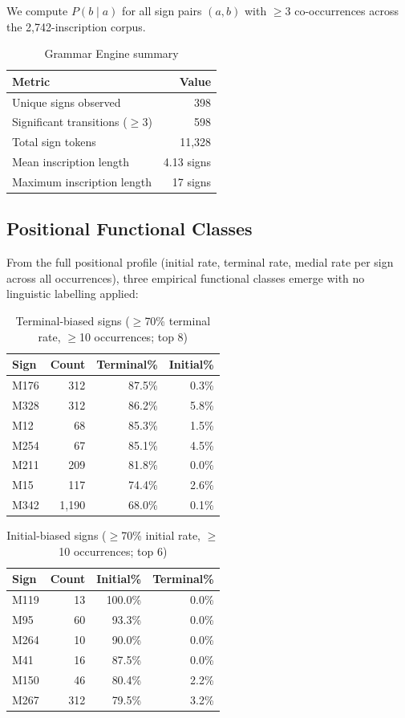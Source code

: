 \documentclass[12pt,letterpaper]{article}
\begin{document}
We compute $P(b \mid a)$ for all sign pairs $(a, b)$ with $\geq 3$
co-occurrences across the 2,742-inscription corpus.

\begin{table}[htbp]
\centering
\caption{Grammar Engine summary}
\begin{tabular}{lr}
\toprule
Metric & Value \\
\midrule
Unique signs observed             & 398 \\
Significant transitions ($\geq$3) & 598 \\
Total sign tokens                 & 11,328 \\
Mean inscription length           & 4.13 signs \\
Maximum inscription length        & 17 signs \\
\bottomrule
\end{tabular}
\end{table}

\subsection{Positional Functional Classes}

From the full positional profile (initial rate, terminal rate, medial
rate per sign across all occurrences), three empirical functional
classes emerge with no linguistic labelling applied:

\begin{table}[H]
\centering
\caption{Terminal-biased signs ($\geq$70\% terminal rate, $\geq$10 occurrences; top 8)}
\begin{tabular}{lrrr}
\toprule
Sign & Count & Terminal\% & Initial\% \\
\midrule
M176 & 312 & 87.5\% & 0.3\% \\
M328 & 312 & 86.2\% & 5.8\% \\
M12  &  68 & 85.3\% & 1.5\% \\
M254 &  67 & 85.1\% & 4.5\% \\
M211 & 209 & 81.8\% & 0.0\% \\
M15  & 117 & 74.4\% & 2.6\% \\
M342 & 1,190 & 68.0\% & 0.1\% \\
\bottomrule
\end{tabular}
\end{table}

\begin{table}[H]
\centering
\caption{Initial-biased signs ($\geq$70\% initial rate, $\geq$10 occurrences; top 6)}
\begin{tabular}{lrrr}
\toprule
Sign & Count & Initial\% & Terminal\% \\
\midrule
M119 &  13 & 100.0\% &  0.0\% \\
M95  &  60 &  93.3\% &  0.0\% \\
M264 &  10 &  90.0\% &  0.0\% \\
M41  &  16 &  87.5\% &  0.0\% \\
M150 &  46 &  80.4\% &  2.2\% \\
M267 & 312 &  79.5\% &  3.2\% \\
\bottomrule
\end{tabular}
\end{table}
\end{document}
